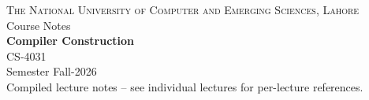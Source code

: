 \documentclass[11pt]{article}
\begin{document}
\pagestyle{empty}

\begin{titlepage}
\centering
\vspace*{3cm}
{\Large\scshape The National University of Computer and Emerging Sciences, Lahore}\\[10pt]
{\large Course Notes}\\[4pt]
{\Huge\bfseries\color{nuNavy} Compiler Construction}\\[4pt]
{\Large CS-4031}\\[8pt]
{\normalsize Semester Fall-2026}\\[2cm]
{\small\sffamily\color{gray} Compiled lecture notes -- see individual lectures for per-lecture references.}
\end{titlepage}

\tableofcontents
\clearpage

\pagestyle{fancy}

\clearpage

\clearpage

\clearpage

\clearpage

\clearpage

\clearpage

\clearpage

\end{document}
